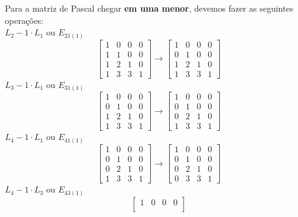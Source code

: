 \documentclass[leqno]{article}
\begin{document}
\begin{enumerate}
		\begin{sol} 
			Para a matriz de Pascal chegar \textbf{em uma menor}, devemos fazer as seguintes operações:\\
			\newline
			$L_2 - 1 \cdot L_1$ ou $E_{21(1)}$ \\
			$$ \begin{bmatrix} 
				1 & 0 & 0 & 0 \\
				1 & 1 & 0 & 0 \\
				1 & 2 & 1 & 0 \\
				1 & 3 & 3 & 1
			\end{bmatrix} \rightarrow 
			\begin{bmatrix} 
				1 & 0 & 0 & 0 \\
				0 & 1 & 0 & 0 \\
				1 & 2 & 1 & 0 \\
				1 & 3 & 3 & 1 
			\end{bmatrix}$$
			$L_3 - 1 \cdot L_1$ ou $E_{31(1)}$ \\
			$$	\begin{bmatrix} 
				1 & 0 & 0 & 0 \\
				0 & 1 & 0 & 0 \\
				1 & 2 & 1 & 0 \\
				1 & 3 & 3 & 1 
			\end{bmatrix} \rightarrow 
			\begin{bmatrix} 
				1 & 0 & 0 & 0 \\
				0 & 1 & 0 & 0 \\
				0 & 2 & 1 & 0 \\
				1 & 3 & 3 & 1 
			\end{bmatrix}$$
			$L_4 - 1 \cdot L_1$ ou $E_{41(1)}$ \\
			$$	\begin{bmatrix} 
				1 & 0 & 0 & 0 \\
				0 & 1 & 0 & 0 \\
				0 & 2 & 1 & 0 \\
				1 & 3 & 3 & 1 
			\end{bmatrix} \rightarrow 
			\begin{bmatrix} 
				1 & 0 & 0 & 0 \\
				0 & 1 & 0 & 0 \\
				0 & 2 & 1 & 0 \\
				0 & 3 & 3 & 1 
			\end{bmatrix}$$
			$L_4 - 1 \cdot L_3$ ou $E_{43(1)}$ \\
			$$	\begin{bmatrix} 
				1 & 0 & 0 & 0 \\

\end{bmatrix}$$
\end{sol}
\end{enumerate}
\end{document}
